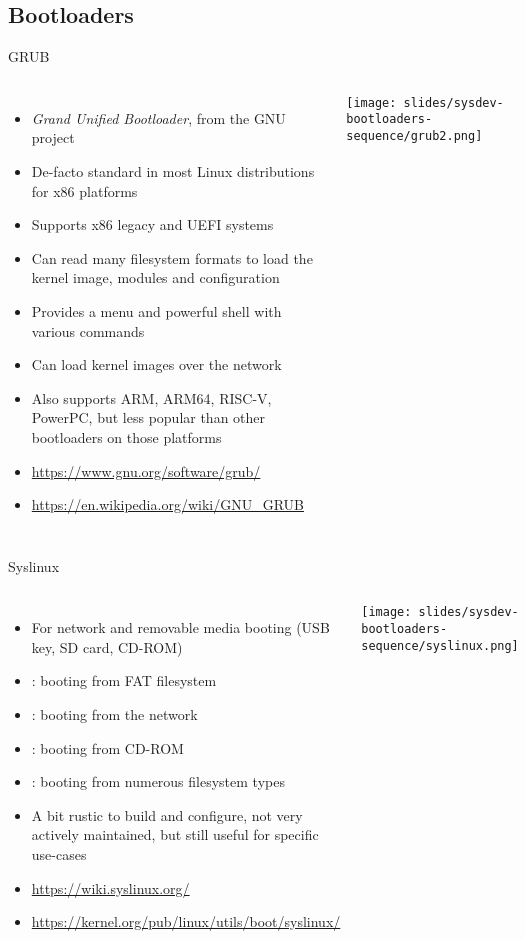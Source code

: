 \subsection{Bootloaders}

\begin{frame}{GRUB}
  \begin{columns}[T]
    \begin{itemize}
    \item {\em Grand Unified Bootloader}, from the GNU project
    \item De-facto standard in most Linux distributions for x86
      platforms
    \item Supports x86 legacy and UEFI systems
    \item Can read many filesystem formats to load the kernel image,
      modules and configuration
    \item Provides a menu and powerful shell with various commands
    \item Can load kernel images over the network
    \item Also supports ARM, ARM64, RISC-V, PowerPC, but less popular
      than other bootloaders on those platforms
    \item \url{https://www.gnu.org/software/grub/}
    \item \url{https://en.wikipedia.org/wiki/GNU_GRUB}
    \end{itemize}
    \texttt{[image: slides/sysdev-bootloaders-sequence/grub2.png]}
  \end{columns}
\end{frame}

\begin{frame}{Syslinux}
  \begin{columns}[T]
    \begin{itemize}
    \item For network and removable media booting (USB key, SD card, CD-ROM)
    \item {}: booting from FAT filesystem
    \item {}: booting from the network
    \item {}: booting from CD-ROM
    \item {}: booting from numerous filesystem types
    \item A bit rustic to build and configure, not very actively
      maintained, but still useful for specific use-cases
    \item \url{https://wiki.syslinux.org/}
    \item \url{https://kernel.org/pub/linux/utils/boot/syslinux/}
    \end{itemize}
    \texttt{[image: slides/sysdev-bootloaders-sequence/syslinux.png]}
  \end{columns}
\end{frame}

